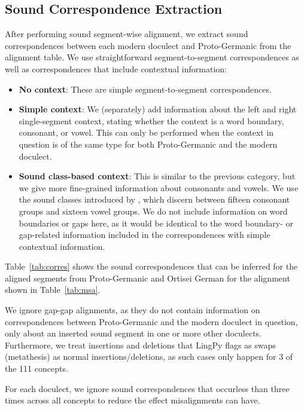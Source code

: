 \documentclass[a4paper]{article}
\begin{document}
\subsection{Sound Correspondence Extraction}

After performing sound segment-wise alignment,
we extract sound correspondences between each
modern doculect and Proto-Germanic from the alignment table.
We use straightforward segment-to-segment correspondences
as well as correspondences that include contextual information:

\begin{itemize}
\item
\textbf{No context}:
These are simple segment-to-segment correspondences.

\item
\textbf{Simple context}:
We (separately) add information about the
left and right single-segment context,
stating whether the context is a
word boundary, consonant, or vowel. 
This can only be performed when the context in question is of
the same type for both Proto-Germanic and the modern doculect.

\item
\textbf{Sound class-based context}:
This is similar to the previous category,
but we give more fine-grained information about consonants and vowels.
We use the sound classes introduced by \citet{list2012sca},
which discern between fifteen consonant groups and sixteen vowel groups.
We do not include information on word boundaries or gaps here,
as it would be identical to the word boundary- or gap-related information
included in the correspondences with simple contextual information.

\end{itemize}


Table~\ref{tab:corres} shows the sound correspondences
that can be inferred for the aligned segments
from Proto-Germanic and Ortisei German for the alignment
shown in Table~\ref{tab:msa}.

We ignore gap-gap alignments,
as they do not contain information on correspondences
between Proto-Germanic and the modern doculect in question,
only about an inserted sound segment in one or more other doculects.
Furthermore, we treat insertions and deletions
that LingPy flags as swaps (metathesis) as normal insertions/deletions,
as such cases only happen for 3 of the 111 concepts.

For each doculect, we ignore sound correspondences
that occurless than three times across all concepts
to reduce the effect misalignments can have. 
\end{document}
